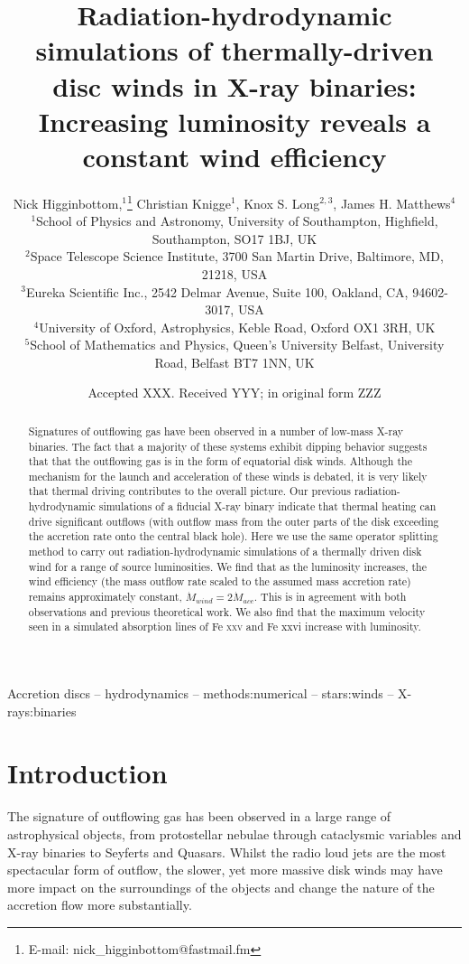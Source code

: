 \documentclass[a4paper,fleqn,usenatbib]{mnras}
\title[Increasing luminosity]{Radiation-hydrodynamic simulations of thermally-driven disc winds in X-ray binaries: Increasing
luminosity reveals a constant wind efficiency}
\author[N. Higginbottom et. al]
{Nick Higginbottom,$^{1}$\thanks{E-mail: nick\_higginbottom@fastmail.fm}
Christian Knigge$^{1}$, Knox S. Long$^{2,3}$, 
James H. Matthews$^{4}$ \newauthor{and
Edward J. Parkinson$^{1}$.}
\\
$^{1}$School of Physics and Astronomy, University of Southampton, Highfield, Southampton, SO17 1BJ, UK\\
$^{2}$Space Telescope Science Institute, 3700 San Martin Drive, Baltimore, MD, 21218, USA\\
$^{3}$Eureka Scientific Inc., 2542 Delmar Avenue, Suite 100, Oakland, CA, 94602-3017, USA\\
$^{4}$University of Oxford, Astrophysics, Keble Road, Oxford OX1 3RH, UK\\
$^{5}$School of Mathematics and Physics, Queen's University Belfast, University Road, Belfast 
BT7 1NN, UK\\
}
\date{Accepted XXX. Received YYY; in original form ZZZ}
\begin{document}
\label{firstpage}
\pagerange{\pageref{firstpage}--\pageref{lastpage}}
\maketitle

\begin{abstract}

Signatures of outflowing gas have been observed in a number of low-mass X-ray binaries. The fact that a majority of these systems exhibit dipping behavior suggests that 
that the outflowing gas is in the form 
of equatorial disk winds. Although the mechanism for the launch and acceleration of these winds is debated, it is very likely
that thermal driving contributes to the overall picture. Our previous radiation-hydrodynamic simulations of a fiducial X-ray binary indicate that thermal heating can drive significant outflows (with outflow mass from the outer parts of the disk exceeding the accretion rate onto the central black hole).
Here we use the same operator splitting method to carry out radiation-hydrodynamic simulations of a thermally driven 
disk wind for a range of source luminosities. We find that as the luminosity increases, the wind efficiency (the mass outflow
rate scaled to the assumed mass accretion rate) remains approximately constant, 
$\dot{M}_{wind}=2\dot{M}_{acc}$. 
This is in agreement
with both observations and previous theoretical work. We also find that the maximum velocity seen in a simulated 
absorption lines of Fe \textsc{xxv} and Fe {xxvi} increase with luminosity. 



\end{abstract}

\begin{keywords}
Accretion discs -- hydrodynamics -- methods:numerical -- stars:winds -- X-rays:binaries
\end{keywords}



\section{Introduction}
The signature of outflowing gas has been observed in a large range of astrophysical objects, from protostellar
nebulae through cataclysmic variables and X-ray binaries to Seyferts and Quasars. Whilst the 
radio loud jets are the most spectacular form of outflow, the slower, yet more massive disk
winds may have more impact on the surroundings of the objects and change the nature
of the accretion flow more substantially.
 
\end{document}
